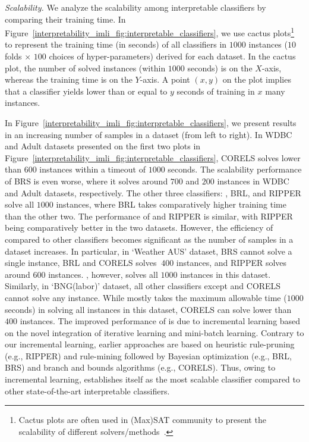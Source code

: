 \textit{Scalability.} We analyze the scalability among interpretable classifiers by comparing their training time. In Figure~\ref{interpretability_imli_fig:interpretable_classifiers}, we use cactus plots\footnote{Cactus plots are often used in (Max)SAT community to present the scalability of different solvers/methods~\cite{argelich2008first,balyo2017sat}.} to represent the training time (in seconds) of all classifiers in $ 1000 $ instances ($ 10 $ folds $ \times  $ $ 100 $ choices of hyper-parameters) derived for each dataset. In the cactus plot, the number of solved instances (within $ 1000 $ seconds) is on the $ X $-axis, whereas the training time is  on the $ Y $-axis. A point $ (x,y) $ on the plot implies that a classifier yields lower than or equal to $ y $ seconds of training in $ x $ many instances. 


In Figure~\ref{interpretability_imli_fig:interpretable_classifiers}, we present results in an increasing number of samples in a dataset (from left to right).
In WDBC and Adult datasets presented on the first two plots in Figure~\ref{interpretability_imli_fig:interpretable_classifiers}, CORELS solves lower than $  600 $ instances within a timeout of $ 1000 $ seconds. The scalability performance of BRS is even worse, where it solves around $ 700 $ and $ 200 $ instances in WDBC and Adult datasets, respectively. The other three classifiers: {\imli}, BRL, and RIPPER  solve all $ 1000 $ instances, where BRL takes comparatively higher training time than the other two. The performance of {\imli} and RIPPER is similar, with RIPPER being comparatively better in the two datasets. However, the efficiency of {\imli} compared to other classifiers becomes significant as the number of samples in a dataset increases. In particular, in `Weather AUS' dataset, BRS cannot solve a single instance, BRL and CORELS solves $ ~400 $ instances, and RIPPER solves around $ 600 $ instances. {\imli}, however, solves all $ 1000 $ instances in this dataset. Similarly, in `BNG(labor)' dataset, all other classifiers except {\imli} and CORELS cannot solve any instance. While {\imli} mostly takes the maximum allowable time ($ 1000 $ seconds) in solving all instances in this dataset, CORELS can solve lower than $ 400 $ instances. The improved performance of {\imli} is due to incremental learning based on the novel integration of iterative learning and mini-batch learning. Contrary to our incremental learning, earlier approaches are based on heuristic rule-pruning (e.g., RIPPER) and rule-mining followed by Bayesian optimization (e.g., BRL, BRS) and branch and bounds algorithms (e.g., CORELS). Thus, owing to incremental learning, {\imli} establishes itself as the most scalable classifier compared to other state-of-the-art interpretable classifiers.


